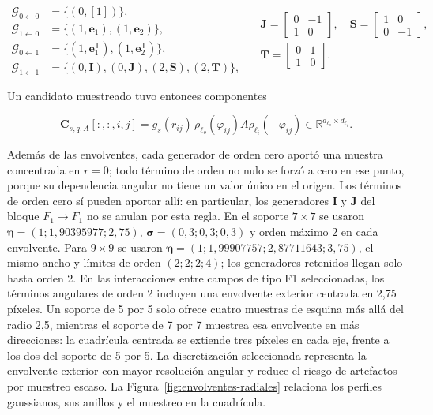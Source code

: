 \begin{equation}
\begin{aligned}
\mathcal G_{0\leftarrow0}&=\{(0,[1])\},\\
\mathcal G_{1\leftarrow0}&=\{(1,\mathbf e_1),(1,\mathbf e_2)\},\\
\mathcal G_{0\leftarrow1}&=\{(1,\mathbf e_1^{\mathsf T}),(1,\mathbf e_2^{\mathsf T})\},\\
\mathcal G_{1\leftarrow1}&=\{(0,\mathbf I),(0,\mathbf J),(2,\mathbf S),(2,\mathbf T)\},
\end{aligned}
\quad
\begin{gathered}
\mathbf J=\begin{bmatrix}0&-1\\1&0\end{bmatrix},\quad
\mathbf S=\begin{bmatrix}1&0\\0&-1\end{bmatrix},\\
\mathbf T=\begin{bmatrix}0&1\\1&0\end{bmatrix}.
\end{gathered}
\label{eq:generadores-f01}
\end{equation}

Un candidato muestreado tuvo entonces componentes

\begin{equation}
    \mathbf C_{s,q,A}[:, :, i,j]
    =g_s(r_{ij})\,
      \rho_{\ell_o}(\varphi_{ij})A
      \rho_{\ell_i}(-\varphi_{ij})
    \in\mathbb R^{d_{\ell_o}\times d_{\ell_i}}.
    \label{eq:muestra-base-f01}
\end{equation}

Además de las envolventes, cada generador de orden cero aportó una muestra
concentrada en \(r=0\); todo término de orden no nulo se forzó a cero en ese
punto, porque su dependencia angular no tiene un valor único en el origen.
Los términos de orden cero sí pueden aportar allí: en particular, los
generadores \(\mathbf I\) y \(\mathbf J\) del bloque \(F_1\!\to F_1\) no se
anulan por esta regla. En el soporte \(7\times7\) se usaron
\(\boldsymbol\eta=(1;1{,}90395977;2{,}75)\),
\(\boldsymbol\sigma=(0{,}3;0{,}3;0{,}3)\) y orden máximo 2 en cada
envolvente. Para \(9\times9\) se usaron
\(\boldsymbol\eta=(1;1{,}99907757;2{,}87711643;3{,}75)\), el mismo ancho y
límites de orden \((2;2;2;4)\); los generadores retenidos llegan solo hasta
orden 2. En las interacciones entre campos de tipo F1 seleccionadas, los
términos angulares de orden 2 incluyen una envolvente exterior centrada en
2,75 píxeles. Un soporte de 5 por 5 solo ofrece cuatro muestras de esquina
más allá del radio 2,5, mientras el soporte de 7 por 7 muestrea esa envolvente
en más direcciones: la cuadrícula centrada se extiende tres píxeles en cada
eje, frente a los dos del soporte de 5 por 5. La discretización seleccionada
representa la envolvente exterior con mayor resolución angular y reduce el
riesgo de artefactos por muestreo escaso. La Figura~\ref{fig:envolventes-radiales}
relaciona los perfiles gaussianos, sus anillos y el muestreo en la cuadrícula.


